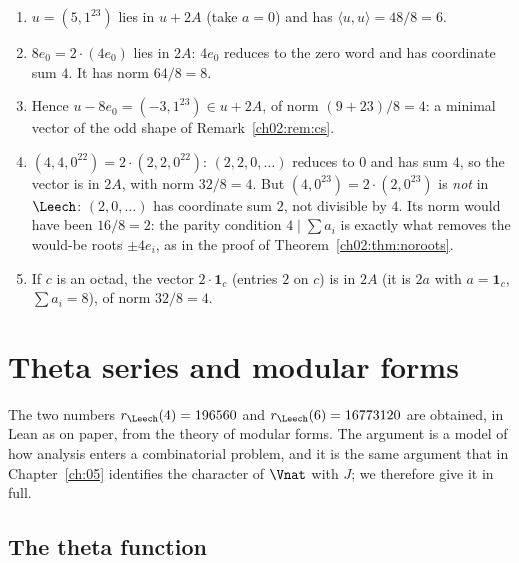 \begin{example}\label{ch02:ex:leechvectors}
\begin{enumerate}
\item $u=(5,1^{23})$ lies in $u+2A$ (take $a=0$) and has $\langle u,u\rangle=48/8=6$.
\item $8e_0=2\cdot(4e_0)$ lies in $2A$: $4e_0$ reduces to the zero word and has coordinate sum
      $4$.  It has norm $64/8=8$.
\item Hence $u-8e_0=(-3,1^{23})\in u+2A$, of norm $(9+23)/8=4$: a minimal vector of the odd
      shape of Remark~\ref{ch02:rem:cs}.
\item $(4,4,0^{22})=2\cdot(2,2,0^{22})$: $(2,2,0,\dots)$ reduces to $0$ and has sum $4$, so the
      vector is in $2A$, with norm $32/8=4$.  But $(4,0^{23})=2\cdot(2,0^{23})$ is \emph{not} in
      $\Leech$: $(2,0,\dots)$ has coordinate sum $2$, not divisible by $4$.  Its norm would have been
      $16/8=2$: the parity condition $4\mid\sum a_i$ is exactly what removes the would-be roots
      $\pm4e_i$, as in the proof of Theorem~\ref{ch02:thm:noroots}.
\item If $c$ is an octad, the vector $2\cdot\mathbf 1_c$ (entries $2$ on $c$) is in $2A$ (it is
      $2a$ with $a=\mathbf 1_c$, $\sum a_i=8$), of norm $32/8=4$.
\end{enumerate}
\end{example}

\section{Theta series and modular forms}\label{ch02:sec:theta}

The two numbers $r_\Leech(4)=196560$ and $r_\Leech(6)=16773120$ are obtained, in Lean as on paper,
from the theory of modular forms.  The argument is a model of how analysis enters a combinatorial
problem, and it is the same argument that in Chapter~\ref{ch:05} identifies the character of
$\Vnat$ with $J$; we therefore give it in full.

\subsection{The theta function}

